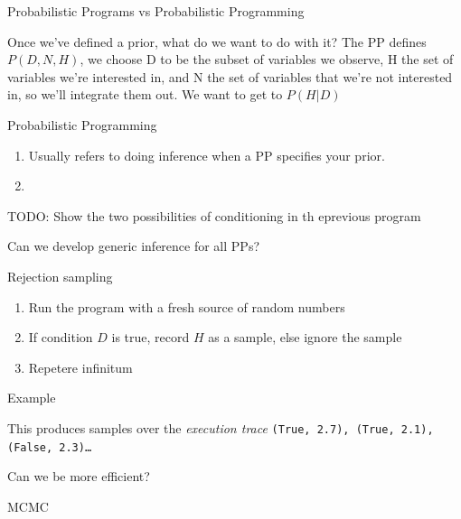 \begin{frame}{Probabilistic Programs vs Probabilistic Programming}
  \begin{block}{Once we've defined a prior, what do we want to do with it?}  
  The PP defines $P(D,N,H)$, we choose D to be the subset of variables we observe, H the set of variables we're interested in, and N the set of variables that we're not interested in, so we'll integrate them out.  We want to get to $P(H|D)$
  \end{block}
      \begin{block}{Probabilistic Programming}
      \begin{enumerate}
        \item Usually refers to doing inference when a PP specifies your prior.
        \item 
      \end{enumerate}
    \end{block}
    TODO: Show the two possibilities of conditioning in th eprevious program
\end{frame}

\begin{frame}{Can we develop generic inference for all PPs?}
  \begin{block}{Rejection sampling}
    \begin{enumerate}
      \item Run the program with a fresh source of random numbers
      \item If condition $D$ is true, record $H$ as a sample, else ignore the sample
      \item Repetere infinitum
    \end{enumerate}
  \end{block}
  \begin{block}{Example}
    \vspace{0.5\baselineskip}
    \centering
    
  \end{block}
  \begin{block}{This produces samples over the \emph{execution trace}}
    \eg \texttt{(True, 2.7), (True, 2.1), (False, 2.3)\ldots}
  \end{block}
\end{frame}

\begin{frame}{Can we be more efficient?}
  \begin{block}{  MCMC}
    \vspace{0.5\baselineskip}
    \centering
    
  \end{block}
\end{frame}

